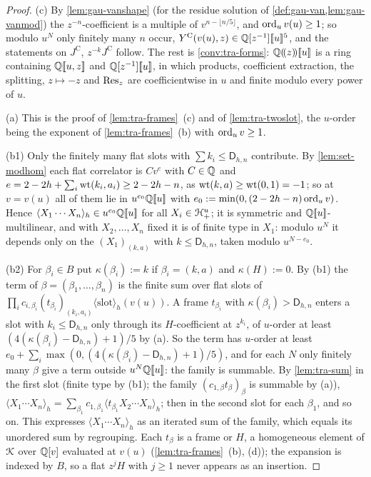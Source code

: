 \begin{proof}
(c) By \cref{lem:gau-vanshape} (for the residue solution of \cref{def:gau-van,lem:gau-vanmod}) the $z^{-n}$-coefficient is a multiple of $v^{n-\lfloor n/5\rfloor}$, and $\operatorname{ord}_uv(u)\geq 1$; so modulo $u^N$ only finitely many $n$ occur, $Y^{\mathrm{C}}(v(u),z)\in\mathbb{Q}[z^{-1}][\![ u ]\!]^5$, and the statements on $J^{\mathrm C}$, $z^{-k}J^{\mathrm C}$ follow. The rest is \cref{conv:tra-forms}: $\mathbb{Q}(\!(z)\!)[\![ u ]\!]$ is a ring containing $\mathbb{Q}[\![ u,z ]\!]$ and $\mathbb{Q}[z^{-1}][\![ u ]\!]$, in which products, coefficient extraction, the splitting, $z\mapsto -z$ and $\operatorname*{Res}_z$ are coefficientwise in $u$ and finite modulo every power of $u$.

(a) This is the proof of \cref{lem:tra-frames}~(c) and of \cref{lem:tra-twoslot}, the $u$-order being the exponent of \cref{lem:tra-frames}~(b) with $\operatorname{ord}_uv\geq 1$.

(b1) Only the finitely many flat slots with $\sum k_i\leq\mathsf D_{h,n}$ contribute. By \cref{lem:set-modhom} each flat correlator is $Cv^e$ with $C\in\mathbb{Q}$ and $e = 2-2h+\sum_i\operatorname{wt}(k_i,a_i)\geq 2-2h-n$, as $\operatorname{wt}(k,a)\geq\operatorname{wt}(0,1) = -1$; so at $v = v(u)$ all of them lie in $u^{e_0}\mathbb{Q}[\![ u ]\!]$ with $e_0 := \min(0,(2-2h-n)\operatorname{ord}_uv)$. Hence $\langle X_1\cdots X_n\rangle_h\in u^{e_0}\mathbb{Q}[\![ u ]\!]$ for all $X_i\in\mathcal{H}^u_+$; it is symmetric and $\mathbb{Q}[\![ u ]\!]$-multilinear, and with $X_2,\dots,X_n$ fixed it is of finite type in $X_1$: modulo $u^N$ it depends only on the $(X_1)_{(k,a)}$ with $k\leq\mathsf D_{h,n}$, taken modulo $u^{N-e_0}$.

(b2) For $\beta_i\in B$ put $\kappa(\beta_i) := k$ if $\beta_i = (k,a)$ and $\kappa(H) := 0$. By (b1) the term of $\beta = (\beta_1,\dots,\beta_n)$ is the finite sum over flat slots of $\prod_ic_{i,\beta_i}(t_{\beta_i})_{(k_i,a_i)}\langle\text{slot}\rangle_h(v(u))$. A frame $t_{\beta_i}$ with $\kappa(\beta_i)>\mathsf D_{h,n}$ enters a slot with $k_i\leq\mathsf D_{h,n}$ only through its $H$-coefficient at $z^{k_i}$, of $u$-order at least $(4(\kappa(\beta_i)-\mathsf D_{h,n})+1)/5$ by (a). So the term has $u$-order at least $e_0+\sum_i\max(0,(4(\kappa(\beta_i)-\mathsf D_{h,n})+1)/5)$, and for each $N$ only finitely many $\beta$ give a term outside $u^N\mathbb{Q}[\![ u ]\!]$: the family is summable. By \cref{lem:tra-sum} in the first slot (finite type by (b1); the family $(c_{1,\beta}t_\beta)_\beta$ is summable by (a)), $\langle X_1\cdots X_n\rangle_h = \sum_{\beta_1}c_{1,\beta_1}\langle t_{\beta_1}X_2\cdots X_n\rangle_h$; then in the second slot for each $\beta_1$, and so on. This expresses $\langle X_1\cdots X_n\rangle_h$ as an iterated sum of the family, which equals its unordered sum by regrouping. Each $t_\beta$ is a frame or $H$, a homogeneous element of $\mathcal{K}$ over $\mathbb{Q}[v]$ evaluated at $v(u)$ (\cref{lem:tra-frames}~(b), (d)); the expansion is indexed by $B$, so a flat $z^jH$ with $j\geq 1$ never appears as an insertion.


\end{proof}
